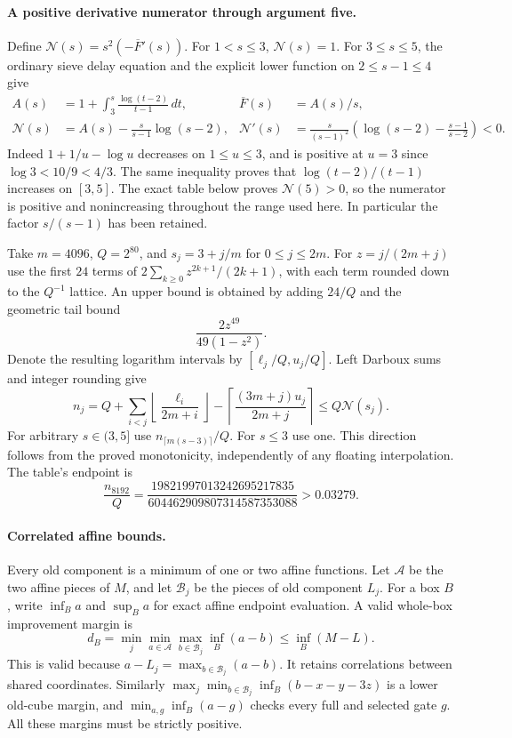 \paragraph{A positive derivative numerator through argument five.}
Define $\mathcal N(s)=s^2(-\overline F'(s))$.
For $1<s\le3$, $\mathcal N(s)=1$.  For $3\le s\le5$, the
ordinary sieve delay equation and the explicit lower function on
$2\le s-1\le4$ give
\begin{align*}
 A(s)&=1+\int_3^s\frac{\log(t-2)}{t-1}\,dt,
 &\overline F(s)&=A(s)/s,\\
 \mathcal N(s)&=A(s)-\frac{s}{s-1}\log(s-2),
 &\mathcal N'(s)&=\frac{s}{(s-1)^2}
       \left(\log(s-2)-\frac{s-1}{s-2}\right)<0.
\end{align*}
Indeed $1+1/u-\log u$ decreases on $1\le u\le3$, and is positive
at $u=3$ since $\log3<10/9<4/3$.  The same inequality proves
that $\log(t-2)/(t-1)$ increases on $[3,5]$.
The exact table below proves $\mathcal N(5)>0$, so the numerator
is positive and nonincreasing throughout the range used here.
In particular the factor $s/(s-1)$ has been retained.

Take $m=4096$, $Q=2^{80}$, and $s_j=3+j/m$ for $0\le j\le2m$.
For $z=j/(2m+j)$ use the first $24$ terms of
$2\sum_{k\ge0}z^{2k+1}/(2k+1)$, with each term rounded down to
the $Q^{-1}$ lattice.  An upper bound is obtained by adding
$24/Q$ and the geometric tail bound
\[
 \frac{2z^{49}}{49(1-z^2)}.
\]
Denote the resulting logarithm intervals by
$[\ell_j/Q,u_j/Q]$.  Left Darboux sums and integer rounding give
\[
 n_j=Q+\sum_{i<j}\left\lfloor\frac{\ell_i}{2m+i}\right\rfloor
       -\left\lceil\frac{(3m+j)u_j}{2m+j}\right\rceil
 \le Q\mathcal N(s_j).
\]
For arbitrary $s\in(3,5]$ use $n_{\lceil m(s-3)\rceil}/Q$.
For $s\le3$ use one.  This direction follows from the proved
monotonicity, independently of any floating interpolation.
The table's endpoint is
\[
 \frac{n_{8192}}Q
 =\frac{19821997013242695217835}{604462909807314587353088}
 >0.03279.
\]

\paragraph{Correlated affine bounds.}
Every old component is a minimum of one or two affine functions.
Let $\mathcal A$ be the two affine pieces of $M$, and let
$\mathcal B_j$ be the pieces of old component $L_j$.
For a box $B$, write $\inf_B a$ and $\sup_B a$ for exact affine
endpoint evaluation.  A valid whole-box improvement margin is
\[
 d_B=\min_j\min_{a\in\mathcal A}
                 \max_{b\in\mathcal B_j}\inf_B(a-b)
 \le\inf_B(M-L).
\]
This is valid because $a-L_j=\max_{b\in\mathcal B_j}(a-b)$.
It retains correlations between shared coordinates.  Similarly
$\max_j\min_{b\in\mathcal B_j}\inf_B(b-x-y-3z)$ is a lower
old-cube margin, and $\min_{a,g}\inf_B(a-g)$ checks every full
and selected gate $g$.  All these margins must be strictly positive.

